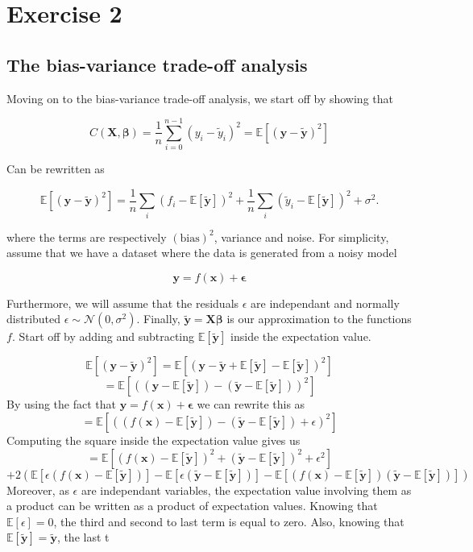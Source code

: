 \documentclass[11pt, a4paper]{article}
\begin{document}
\section*{\label{ex:2}Exercise 2}


\subsection*{The bias-variance trade-off analysis}

Moving on to the bias-variance trade-off analysis, we start off by showing that

\[
  C(\bm{X},\bm{\beta}) =\frac{1}{n}\sum_{i=0}^{n-1}(y_i-\tilde{y}_i)^2=\mathbb{E}\left[(\bm{y}-\bm{\tilde{y}})^2\right]
\]

Can be rewritten as

\[
  \mathbb{E}\left[(\bm{y}-\bm{\tilde{y}})^2\right]=\frac{1}{n}\sum_i(f_i-\mathbb{E}\left[\bm{\tilde{y}}\right])^2+\frac{1}{n}\sum_i(\tilde{y}_i-\mathbb{E}\left[\bm{\tilde{y}}\right])^2+\sigma^2.
\]

where the terms are respectively $(\text{bias})^2$, variance and noise. For simplicity, assume that we have a dataset where the data is generated from a noisy model

\[\bm{y} = f(\bm{x}) + \bm{\epsilon}\]

Furthermore, we will assume that the residuals $\epsilon$ are independant and normally distributed $\epsilon \sim \mathcal{N}(0, \sigma^2)$. Finally, $\bm{\tilde{y}} = \bm{X}\bm{\beta}$ is our approximation to the functions $f$. Start off by adding and subtracting $\mathbb{E}\left[\bm{\tilde{y}}\right]$ inside the expectation value.

\[
  \mathbb{E}\left[(\bm{y}-\bm{\tilde{y}})^2\right]
  = \mathbb{E}\left[(\bm{y}-\bm{\tilde{y}} + \mathbb{E}\left[\bm{\tilde{y}}\right] - \mathbb{E}\left[\bm{\tilde{y}}\right])^2\right]
\]
\[
  = \mathbb{E}\left[((\bm{y} - \mathbb{E}\left[\bm{\tilde{y}}\right]) - (\bm{\tilde{y}} - \mathbb{E}\left[\bm{\tilde{y}}\right]))^2\right]
\]
By using the fact that $\bm{y} = f(\bm{x}) + \bm{\epsilon}$
we can rewrite this as
\[
  = \mathbb{E}\left[((f(\bm{x}) - \mathbb{E}\left[\bm{\tilde{y}}\right]) - (\bm{\tilde{y}} - \mathbb{E}\left[\bm{\tilde{y}}\right]) + \epsilon)^2\right]
\]
Computing the square inside the expectation value gives us
\[
  = \mathbb{E}\left[(f(\bm{x}) - \mathbb{E}\left[\bm{\tilde{y}}\right])^2 + (\bm{\tilde{y}} - \mathbb{E}\left[\bm{\tilde{y}}\right])^2 + \epsilon^2 \right]\]
\[+ 2\left(\mathbb{E}\left[\epsilon(f(\bm{x}) - \mathbb{E}\left[\bm{\tilde{y}}\right])\right]- \mathbb{E}\left[\epsilon(\bm{\tilde{y}} - \mathbb{E}\left[\bm{\tilde{y}}\right])\right] - \mathbb{E}\left[(f(\bm{x}) - \mathbb{E}\left[\bm{\tilde{y}}\right])(\bm{\tilde{y}} - \mathbb{E}\left[\bm{\tilde{y}}\right])\right]\right)
\]
Moreover, as $\epsilon$ are independant variables, the expectation value involving them as a product can be written as a product of expectation values. Knowing that $\mathbb{E}\left[\epsilon\right] = 0$, the third and second to last term is equal to zero. Also, knowing that $\mathbb{E}\left[\bm{\tilde{y}}\right] = \bm{\tilde{y}}$, the last t
\end{document}
